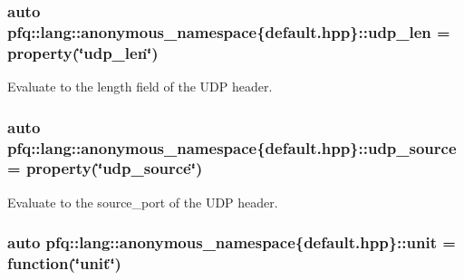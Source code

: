 \subsubsection[{\texorpdfstring{udp\+\_\+len}{udp_len}}]{\setlength{\rightskip}{0pt plus 5cm}auto pfq\+::lang\+::anonymous\+\_\+namespace\{default.\+hpp\}\+::udp\+\_\+len = {\bf property}(\char`\"{}udp\+\_\+len\char`\"{})}\hypertarget{namespacepfq_1_1lang_1_1anonymous__namespace_02default_8hpp_03_ac7f1ef80a8ec46ce01aa12f66cfee86b}{}\label{namespacepfq_1_1lang_1_1anonymous__namespace_02default_8hpp_03_ac7f1ef80a8ec46ce01aa12f66cfee86b}


Evaluate to the {\ttfamily length} field of the U\+DP header. 

\subsubsection[{\texorpdfstring{udp\+\_\+source}{udp_source}}]{\setlength{\rightskip}{0pt plus 5cm}auto pfq\+::lang\+::anonymous\+\_\+namespace\{default.\+hpp\}\+::udp\+\_\+source = {\bf property}(\char`\"{}udp\+\_\+source\char`\"{})}\hypertarget{namespacepfq_1_1lang_1_1anonymous__namespace_02default_8hpp_03_ab44590359ef60febe9bfc6465bcf932a}{}\label{namespacepfq_1_1lang_1_1anonymous__namespace_02default_8hpp_03_ab44590359ef60febe9bfc6465bcf932a}


Evaluate to the {\ttfamily source\+\_\+port} of the U\+DP header. 

\subsubsection[{\texorpdfstring{unit}{unit}}]{\setlength{\rightskip}{0pt plus 5cm}auto pfq\+::lang\+::anonymous\+\_\+namespace\{default.\+hpp\}\+::unit = {\bf function}(\char`\"{}unit\char`\"{})}\hypertarget{namespacepfq_1_1lang_1_1anonymous__namespace_02default_8hpp_03_a85f9b2d401cbb1d135679160de0e97de}{}\label{namespacepfq_1_1lang_1_1anonymous__namespace_02default_8hpp_03_a85f9b2d401cbb1d135679160de0e97de}


